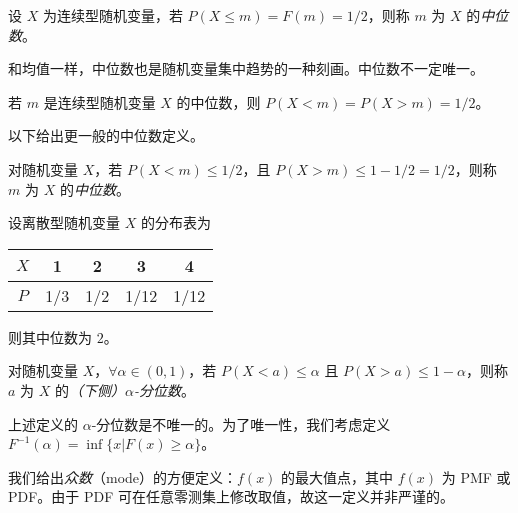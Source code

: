 \documentclass[../main.tex]{subfiles}
\begin{document}
\begin{definition}\label{def:4.2.1}
设 $X$ 为连续型随机变量，若 $P(X\leq m)=F(m)=1/2$，则称 $m$ 为 $X$ 的\emph{中位数}。
\end{definition}

和均值一样，中位数也是随机变量集中趋势的一种刻画。中位数不一定唯一。

若 $m$ 是连续型随机变量 $X$ 的中位数，则 $P(X<m)=P(X>m)=1/2$。

以下给出更一般的中位数定义。

\begin{definition}\label{def:4.2.2}
对随机变量 $X$，若 $P(X<m)\leq 1/2$，且 $P(X>m)\leq 1-1/2=1/2$，则称 $m$ 为 $X$ 的\emph{中位数}。
\end{definition}

\begin{example}
设离散型随机变量 $X$ 的分布表为

\bigskip
\begin{tabular}{|c|c|c|c|c|}
\hline
$X$ & 1 & 2 & 3 & 4 \\
\hline
$P$ & 1/3 & 1/2 & 1/12 & 1/12 \\
\hline
\end{tabular}
\bigskip

则其中位数为 $2$。
\end{example}

\begin{definition}\label{4.2.3}
对随机变量 $X$，$\forall\alpha\in(0,1)$，若 $P(X<a)\leq\alpha$ 且 $P(X>a)\leq1-\alpha$，则称 $a$ 为 $X$ 的\emph{（下侧）$\alpha$-分位数}。
\end{definition}

上述定义的 $\alpha$-分位数是不唯一的。为了唯一性，我们考虑定义 $F^{-1}(\alpha)=\inf\{x|F(x)\geq\alpha\}$。

我们给出\emph{众数}（mode）的方便定义：$f(x)$ 的最大值点，其中 $f(x)$ 为 PMF 或 PDF。由于 PDF 可在任意零测集上修改取值，故这一定义并非严谨的。
\end{document}
